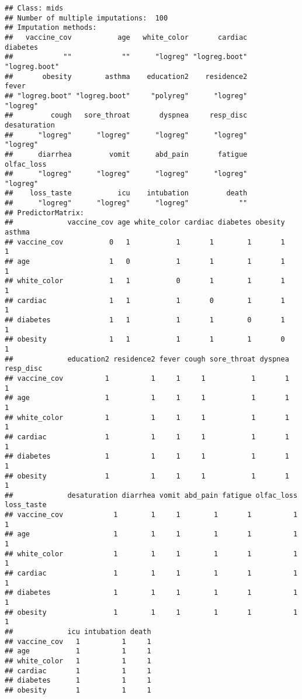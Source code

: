 \documentclass[
]{article}
\begin{document}
\begin{verbatim}
## Class: mids
## Number of multiple imputations:  100 
## Imputation methods:
##   vaccine_cov           age   white_color       cardiac      diabetes 
##            ""            ""      "logreg" "logreg.boot" "logreg.boot" 
##       obesity        asthma    education2    residence2         fever 
## "logreg.boot" "logreg.boot"     "polyreg"      "logreg"      "logreg" 
##         cough   sore_throat       dyspnea     resp_disc  desaturation 
##      "logreg"      "logreg"      "logreg"      "logreg"      "logreg" 
##      diarrhea         vomit      abd_pain       fatigue    olfac_loss 
##      "logreg"      "logreg"      "logreg"      "logreg"      "logreg" 
##    loss_taste           icu    intubation         death 
##      "logreg"      "logreg"      "logreg"            "" 
## PredictorMatrix:
##             vaccine_cov age white_color cardiac diabetes obesity asthma
## vaccine_cov           0   1           1       1        1       1      1
## age                   1   0           1       1        1       1      1
## white_color           1   1           0       1        1       1      1
## cardiac               1   1           1       0        1       1      1
## diabetes              1   1           1       1        0       1      1
## obesity               1   1           1       1        1       0      1
##             education2 residence2 fever cough sore_throat dyspnea resp_disc
## vaccine_cov          1          1     1     1           1       1         1
## age                  1          1     1     1           1       1         1
## white_color          1          1     1     1           1       1         1
## cardiac              1          1     1     1           1       1         1
## diabetes             1          1     1     1           1       1         1
## obesity              1          1     1     1           1       1         1
##             desaturation diarrhea vomit abd_pain fatigue olfac_loss loss_taste
## vaccine_cov            1        1     1        1       1          1          1
## age                    1        1     1        1       1          1          1
## white_color            1        1     1        1       1          1          1
## cardiac                1        1     1        1       1          1          1
## diabetes               1        1     1        1       1          1          1
## obesity                1        1     1        1       1          1          1
##             icu intubation death
## vaccine_cov   1          1     1
## age           1          1     1
## white_color   1          1     1
## cardiac       1          1     1
## diabetes      1          1     1
## obesity       1          1     1
\end{verbatim}
\end{document}
